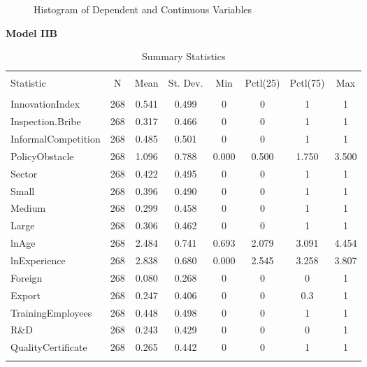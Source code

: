 \begin{figure}[H]%
    \centering
    \begin{subfigure}
    \texttt{[image: chinchilab-template/Pictures/Model4.2\_hist\_a.png]}
    \end{subfigure}
    \begin{subfigure}
    \texttt{[image: chinchilab-template/Pictures/Model4.2\_hist\_b.png]}
    \end{subfigure}
    \begin{subfigure}
    \texttt{[image: chinchilab-template/Pictures/Model4.2\_hist\_c.png]}
    \end{subfigure}
    \begin{subfigure}
    \texttt{[image: chinchilab-template/Pictures/Model4.2\_hist\_d.png]}
    \end{subfigure}
    \caption*{Histogram of Dependent and Continuous Variables}%
\end{figure}
\clearpage
\newpage
\textbf{\Large Model IIB}
\begin{table}[H] \centering 
  \caption*{Summary Statistics} 
\begin{tabular}{@{\extracolsep{5pt}}lccccccc} 
\\[-1.8ex]\hline 
\hline \\[-1.8ex] 
Statistic & \multicolumn{1}{c}{N} & \multicolumn{1}{c}{Mean} & \multicolumn{1}{c}{St. Dev.} & \multicolumn{1}{c}{Min} & \multicolumn{1}{c}{Pctl(25)} & \multicolumn{1}{c}{Pctl(75)} & \multicolumn{1}{c}{Max} \\ 
\hline \\[-1.8ex] 
InnovationIndex & 268 & 0.541 & 0.499 & 0 & 0 & 1 & 1 \\ 
Inspection.Bribe & 268 & 0.317 & 0.466 & 0 & 0 & 1 & 1 \\ 
InformalCompetition & 268 & 0.485 & 0.501 & 0 & 0 & 1 & 1 \\ 
PolicyObstacle & 268 & 1.096 & 0.788 & 0.000 & 0.500 & 1.750 & 3.500 \\ 
Sector & 268 & 0.422 & 0.495 & 0 & 0 & 1 & 1 \\ 
Small & 268 & 0.396 & 0.490 & 0 & 0 & 1 & 1 \\ 
Medium & 268 & 0.299 & 0.458 & 0 & 0 & 1 & 1 \\ 
Large & 268 & 0.306 & 0.462 & 0 & 0 & 1 & 1 \\ 
lnAge & 268 & 2.484 & 0.741 & 0.693 & 2.079 & 3.091 & 4.454 \\ 
lnExperience & 268 & 2.838 & 0.680 & 0.000 & 2.545 & 3.258 & 3.807 \\ 
Foreign & 268 & 0.080 & 0.268 & 0 & 0 & 0 & 1 \\ 
Export & 268 & 0.247 & 0.406 & 0 & 0 & 0.3 & 1 \\ 
TrainingEmployees & 268 & 0.448 & 0.498 & 0 & 0 & 1 & 1 \\ 
R\&D & 268 & 0.243 & 0.429 & 0 & 0 & 0 & 1 \\ 
QualityCertificate & 268 & 0.265 & 0.442 & 0 & 0 & 1 & 1 \\ 
\hline \\[-1.8ex] 
\end{tabular} 
\end{table} 


